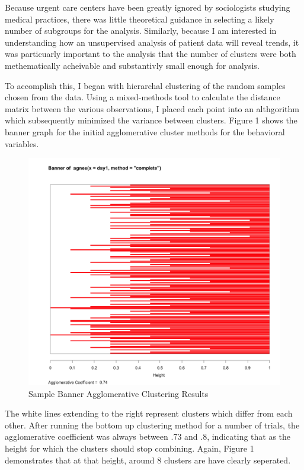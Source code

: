 \documentclass[12pt,twoside]{reedthesis}
\begin{document}
  Because urgent care centers have been greatly ignored by sociologists
  studying medical practices, there was little theoretical guidance in
  selecting a likely number of subgroups for the analysis. Similarly,
  because I am interested in understanding how an unsupervised analysis of
  patient data will reveal trends, it was particuarly important to the
  analysis that the number of clusters were both methematically acheivable
  and substantivly small enough for analysis.
  
  To accomplish this, I began with hierarchal clustering of the random
  samples chosen from the data. Using a mixed-methods tool to calculate
  the distance matrix between the various observations, I placed each
  point into an althgorithm which subsequently minimized the variance
  between clusters. Figure 1 shows the banner graph for the initial
  agglomerative cluster methods for the behavioral variables.
  
  \begin{figure}[h!tbp]
  \centering
  \includegraphics[angle = 0,scale = 0.35]{figures/banner.png}
  \caption[Sample Banner Agglomerative Clustering Results]{\normalsize{Sample Banner Agglomerative Clustering Results}}
  \label{fig:ban1}
  \end{figure}
  
  The white lines extending to the right represent clusters which differ
  from each other. After running the bottom up clustering method for a
  number of trials, the agglomerative coefficient was always between .73
  and .8, indicating that as the height for which the clusters should stop
  combining. Again, Figure 1 demonstrates that at that height, around 8
  clusters are have clearly seperated.
  
\end{document}
